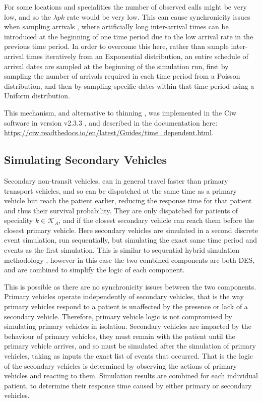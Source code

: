 \documentclass[preprint,12pt]{elsarticle}
\begin{document}
For some locations and specialities the number of observed calls might be very
low, and so the $\lambda{pk}$ rate would be very low. This can cause
synchronicity issues when sampling arrivals \citep{pidd2004computer}, where
artificially long inter-arrival times can be introduced at the beginning of
one time period due to the low arrival rate in the previous time period.
In order to overcome this here, rather than sample inter-arrival times
iteratively from an Exponential distribution, an entire schedule of arrival
dates are sampled at the beginning of the simulation run, first by sampling
the number of arrivals required in each time period from a Poisson
distribution, and then by sampling specific dates within that time period
using a Uniform distribution.

This mechanism, and alternative to thinning \cite{lewisshedler79}, was
implemented in the Ciw software in version v2.3.3 \cite{ciw233}, and described
in the documentation here:
\url{https://ciw.readthedocs.io/en/latest/Guides/time_dependent.html}.


\subsection{Simulating Secondary Vehicles}\label{sec:simulation_secondary}
Secondary non-transit vehicles, can in general travel faster than primary
transport vehicles, and so can be dispatched at the same time as a primary
vehicle but reach the patient earlier, reducing the response time for that
patient and thus their survival probability. They are only dispatched for
patients of speciality $k \in \mathcal{K}_A$, and if the closest secondary
vehicle can reach them before the closest primary vehicle.
Here secondary vehicles are simulated in a second discrete event simulation,
run sequentially, but simulating the exact same time period and events as the
first simulation. This is similar to sequential hybrid simulation methodology
\cite{brailsfordetal19, morganetal17}, however in this case the two combined
components are both DES, and are combined to simplify the logic of each
component.

This is possible as there are no synchronicity issues between the two
components. Primary vehicles operate independently of secondary vehicles, that
is the way primary vehicles respond to a patient is unaffected by the presence
or lack of a secondary vehicle.
Therefore, primary vehicle logic is not compromised by simulating primary
vehicles in isolation.
Secondary vehicles are impacted by the behaviour of primary vehicles, they
must remain with the patient until the primary vehicle arrives, and so must be
simulated after the simulation of primary vehicles, taking as inputs the exact
list of events that occurred. That is the logic of the secondary vehicles is
determined by observing the actions of primary vehicles and reacting to them.
Simulation results are combined for each individual patient, to determine
their response time caused by either primary or secondary vehicles.
\end{document}
